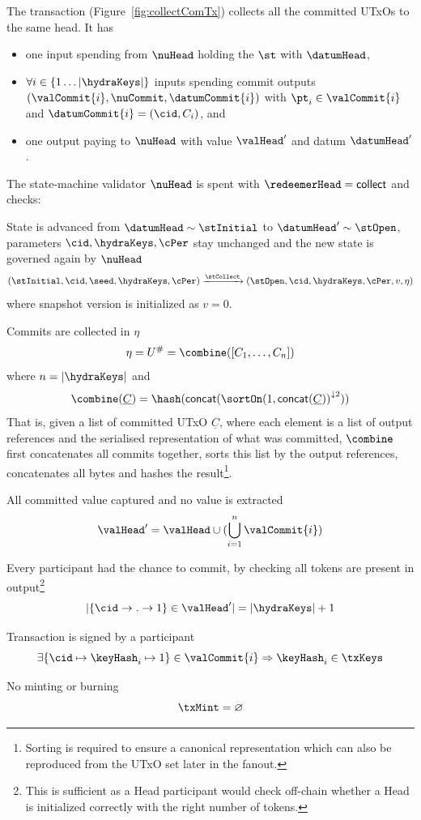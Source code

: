 \noindent The \mtxCCom{} transaction (Figure~\ref{fig:collectComTx}) collects
all the committed UTxOs to the same head. It has
\begin{itemize}
  \item one input spending from $\nuHead$ holding the $\st$ with $\datumHead$,
  \item $\forall i \in \{1 \dots |\hydraKeys|\}$ inputs spending commit outputs
  $(\valCommit{i}, \nuCommit, \datumCommit{i})$ with $\pt_{i} \in \valCommit{i}$
  and $\datumCommit{i} = (\cid, C_{i})$, and
  \item one output paying to $\nuHead$ with value $\valHead'$ and
  datum $\datumHead'$.
\end{itemize}

\noindent The state-machine validator $\nuHead$ is spent with
$\redeemerHead = \mathsf{collect}$ and checks:
\begin{menumerate}
  \item State is advanced from $\datumHead \sim \stInitial$ to
  $\datumHead' \sim \stOpen$, parameters $\cid,\hydraKeys,\cPer$ stay
  unchanged and the new state is governed again by $\nuHead$
  \[
	(\stInitial,\cid,\seed,\hydraKeys,\cPer) \xrightarrow{\stCollect} (\stOpen,\cid,\hydraKeys,\cPer,v,\eta)
  \]
  where snapshot version is initialized as $v = 0$.
  \item Commits are collected in $\eta$
  \[
	\eta = U^{\#} = \combine([C_{1}, \dots, C_{n}])
  \]
  where $n = |\hydraKeys|$ and
  \[
	\combine(\underline{C}) = \hash(\mathsf{concat}({\sortOn(1, \mathsf{concat}(\underline{C}))}^{\downarrow2}))
  \]
  That is, given a list of committed UTxO $\underline{C}$, where each element is
  a list of output references and the serialised representation of what was
  committed, $\combine$ first concatenates all commits together, sorts this list
  by the output references, concatenates all bytes and hashes the
  result\footnote{Sorting is required to ensure a canonical representation which
	can also be reproduced from the UTxO set later in the fanout.}.

  \item All committed value captured and no value is extracted
  \[
	\valHead' = \valHead \cup (\bigcup_{i=1}^{n} \valCommit{i})
  \]
  \item Every participant had the chance to commit, by checking all tokens are
  present in output\footnote{This is sufficient as a Head participant would
	check off-chain whether a Head is initialized correctly with the right
	number of tokens.}
  \[
	|\{\cid \rightarrow . \rightarrow 1\} \in \valHead'| = |\hydraKeys| + 1
  \]
  \item Transaction is signed by a participant
  \[
	\exists \{\cid \mapsto \keyHash_{i} \mapsto 1\} \in \valCommit{i} \Rightarrow \keyHash_{i} \in \txKeys
  \]
  \item No minting or burning
  \[
	\txMint = \varnothing
  \]
\end{menumerate}

